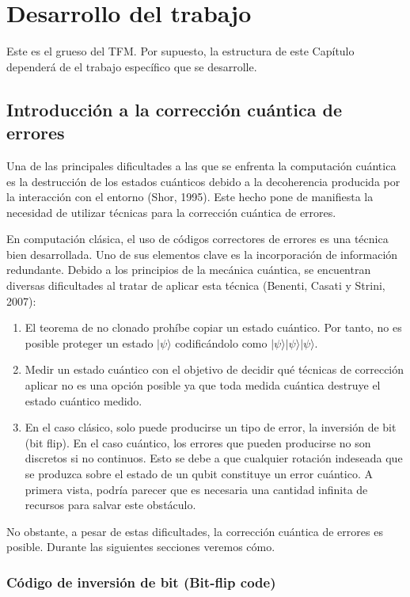 \chapter{Desarrollo del trabajo}
Este es el grueso del TFM. Por supuesto, la estructura de este Capítulo dependerá de el trabajo específico que se desarrolle.

\section{Introducción a la corrección cuántica de errores}

Una de las principales dificultades a las que se enfrenta la computación cuántica es la destrucción de los estados cuánticos debido a la decoherencia producida por la interacción con el entorno (Shor, 1995). Este hecho pone de manifiesta la necesidad de utilizar técnicas para la corrección cuántica de errores.

En computación clásica, el uso de códigos correctores de errores es una técnica bien desarrollada. Uno de sus elementos clave es la incorporación de información redundante. Debido a los principios de la mecánica cuántica, se encuentran diversas dificultades al tratar de aplicar esta técnica (Benenti, Casati y Strini, 2007):
\begin{enumerate}
    \item El teorema de no clonado prohíbe copiar un estado cuántico. Por tanto, no es posible proteger un estado $ | \psi \rangle $ codificándolo como $| \psi \rangle | \psi \rangle | \psi \rangle $.
    \item Medir un estado cuántico con el objetivo de decidir qué técnicas de corrección aplicar no es una opción posible ya que toda medida cuántica destruye el estado cuántico medido.
    \item En el caso clásico, solo puede producirse un tipo de error, la inversión de bit (bit flip). En el caso cuántico, los errores que pueden producirse no son discretos si no continuos. Esto se debe a que cualquier rotación indeseada que se produzca sobre el estado de un qubit constituye un error cuántico. A primera vista, podría parecer que es necesaria una cantidad infinita de recursos para salvar este obstáculo.
\end{enumerate}

No obstante, a pesar de estas dificultades, la corrección cuántica de errores es posible. Durante las siguientes secciones veremos cómo.

\subsection{Código de inversión de bit (Bit-flip code)}

